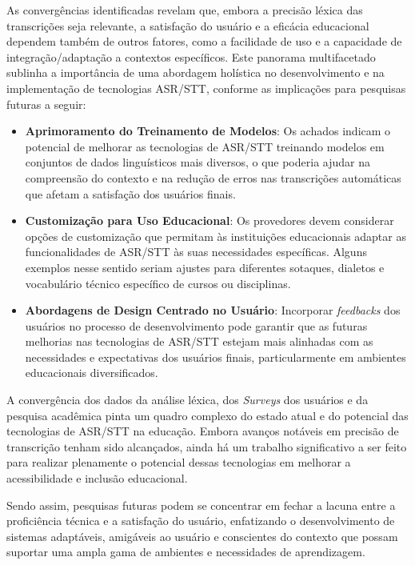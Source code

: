 As convergências identificadas revelam que, embora a precisão léxica das transcrições seja relevante, a satisfação do usuário e a eficácia educacional dependem também de outros fatores, como a facilidade de uso e a capacidade de integração/adaptação a contextos específicos. Este panorama multifacetado sublinha a importância de uma abordagem holística no desenvolvimento e na implementação de tecnologias ASR/STT, conforme as implicações para pesquisas futuras a seguir:

\begin{itemize}
\item \textbf{Aprimoramento do Treinamento de Modelos}: Os achados indicam o potencial de melhorar as tecnologias de ASR/STT treinando modelos em conjuntos de dados linguísticos mais diversos, o que poderia ajudar na compreensão do contexto e na redução de erros nas transcrições automáticas que afetam a satisfação dos usuários finais.

\item \textbf{Customização para Uso Educacional}: Os provedores devem considerar opções de customização que permitam às instituições educacionais adaptar as funcionalidades de ASR/STT às suas necessidades específicas. Alguns exemplos nesse sentido seriam ajustes para diferentes sotaques, dialetos e vocabulário técnico específico de cursos ou disciplinas.

\item \textbf{Abordagens de Design Centrado no Usuário}: Incorporar \textit{feedbacks} dos usuários no processo de desenvolvimento pode garantir que as futuras melhorias nas tecnologias de ASR/STT estejam mais alinhadas com as necessidades e expectativas dos usuários finais, particularmente em ambientes educacionais diversificados.

\end{itemize}

A convergência dos dados da análise léxica, dos \textit{Surveys} dos usuários e da pesquisa acadêmica pinta um quadro complexo do estado atual e do potencial das tecnologias de ASR/STT na educação. Embora avanços notáveis em precisão de transcrição tenham sido alcançados, ainda há um trabalho significativo a ser feito para realizar plenamente o potencial dessas tecnologias em melhorar a acessibilidade e inclusão educacional.

Sendo assim, pesquisas futuras podem se concentrar em fechar a lacuna entre a proficiência técnica e a satisfação do usuário, enfatizando o desenvolvimento de sistemas adaptáveis, amigáveis ao usuário e conscientes do contexto que possam suportar uma ampla gama de ambientes e necessidades de aprendizagem.


